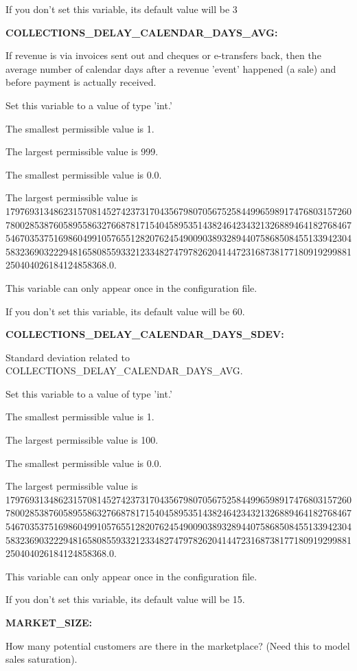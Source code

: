 If you don't set this variable, its default value will be 3


\textbf{COLLECTIONS\_DELAY\_CALENDAR\_DAYS\_AVG:}


If revenue is via invoices sent out and cheques or e-transfers back, then the average number of calendar days after a revenue 'event' happened (a sale) and before payment is actually received.

Set this variable to a value of type 'int.'

The smallest permissible value is 1.

The largest permissible value is 999.

The smallest permissible value is 0.0.

The largest permissible value is 179769313486231570814527423731704356798070567525844996598917476803157260780028538760589558632766878171540458953514382464234321326889464182768467546703537516986049910576551282076245490090389328944075868508455133942304583236903222948165808559332123348274797826204144723168738177180919299881250404026184124858368.0.

This variable can only appear once in the configuration file.

If you don't set this variable, its default value will be 60.


\textbf{COLLECTIONS\_DELAY\_CALENDAR\_DAYS\_SDEV:}


Standard deviation related to COLLECTIONS\_DELAY\_CALENDAR\_DAYS\_AVG.

Set this variable to a value of type 'int.'

The smallest permissible value is 1.

The largest permissible value is 100.

The smallest permissible value is 0.0.

The largest permissible value is 179769313486231570814527423731704356798070567525844996598917476803157260780028538760589558632766878171540458953514382464234321326889464182768467546703537516986049910576551282076245490090389328944075868508455133942304583236903222948165808559332123348274797826204144723168738177180919299881250404026184124858368.0.

This variable can only appear once in the configuration file.

If you don't set this variable, its default value will be 15.


\textbf{MARKET\_SIZE:}


How many potential customers are there in the marketplace?  (Need this to model sales saturation).

